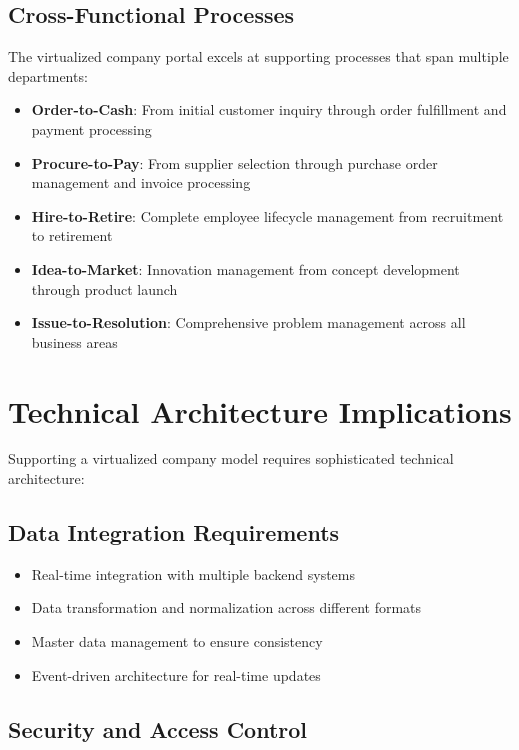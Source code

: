 \subsection{Cross-Functional Processes}

The virtualized company portal excels at supporting processes that span multiple departments:

\begin{itemize}
    \item \textbf{Order-to-Cash}: From initial customer inquiry through order fulfillment and payment processing
    \item \textbf{Procure-to-Pay}: From supplier selection through purchase order management and invoice processing
    \item \textbf{Hire-to-Retire}: Complete employee lifecycle management from recruitment to retirement
    \item \textbf{Idea-to-Market}: Innovation management from concept development through product launch
    \item \textbf{Issue-to-Resolution}: Comprehensive problem management across all business areas
\end{itemize}

\section{Technical Architecture Implications}
\label{sec:technical-implications}

Supporting a virtualized company model requires sophisticated technical architecture:

\subsection{Data Integration Requirements}

\begin{itemize}
    \item Real-time integration with multiple backend systems
    \item Data transformation and normalization across different formats
    \item Master data management to ensure consistency
    \item Event-driven architecture for real-time updates
\end{itemize}

\subsection{Security and Access Control}

